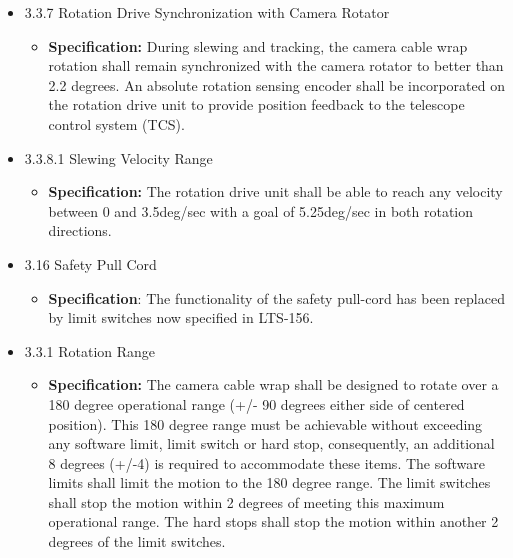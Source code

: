 \documentclass[SE,lsstdraft,authoryear,toc]{lsstdoc}
\begin{document}
\begin{itemize}
\item
  3.3.7 Rotation Drive Synchronization with Camera Rotator

  \begin{itemize}
  \item
    \textbf{Specification:} During slewing and tracking, the camera
    cable wrap rotation shall remain synchronized with the camera
    rotator to better than 2.2 degrees. An absolute rotation sensing
    encoder shall be incorporated on the rotation drive unit to provide
    position feedback to the telescope control system (TCS).
  \end{itemize}
\item
  3.3.8.1 Slewing Velocity Range

  \begin{itemize}
  \item
    \textbf{Specification:} The rotation drive unit shall be able to
    reach any velocity between 0 and 3.5deg/sec with a goal of
    5.25deg/sec in both rotation directions.
  \end{itemize}
\item
  3.16 Safety Pull Cord

  \begin{itemize}
  \item
    \textbf{Specification}: The functionality of the safety pull-cord
    has been replaced by limit switches now specified in LTS-156.
  \end{itemize}
\item
  3.3.1 Rotation Range

  \begin{itemize}
  \item
    \textbf{Specification:} The camera cable wrap shall be designed to rotate
    over a 180 degree operational range (+/- 90 degrees either side of
    centered position). This 180 degree range must be achievable without
    exceeding any software limit, limit switch or hard stop,
    consequently, an additional 8 degrees (+/-4) is required to
    accommodate these items. The software limits shall limit the motion
    to the 180 degree range. The limit switches shall stop the motion
    within 2 degrees of meeting this maximum operational range. The hard
    stops shall stop the motion within another 2 degrees of the limit
    switches.
  \end{itemize}
\end{itemize}

\underline{}
\end{document}
